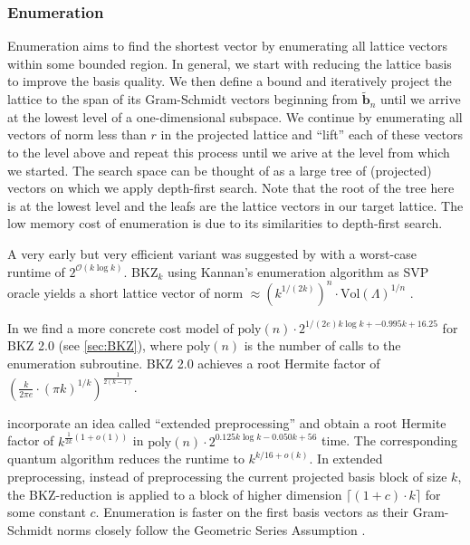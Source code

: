 \subsubsection{Enumeration} %
Enumeration aims to find the shortest vector by enumerating all lattice vectors within some bounded region. In general, we start with reducing the lattice basis to improve the basis quality. We then define a bound and iteratively project the lattice to the span of its Gram-Schmidt vectors beginning from $\tilde{\mathbf{b}}_n$ until we arrive at the lowest level of a one-dimensional subspace. We continue by enumerating all vectors of norm less than $r$ in the projected lattice and ``lift'' each of these vectors to the level above and repeat this process until we arive at the level from which we started. The search space can be thought of as a large tree of (projected) vectors on which we apply depth-first search. Note that the root of the tree here is at the lowest level and the leafs are the lattice vectors in our target lattice. %
The low memory cost of enumeration is due to its similarities to depth-first search. 

A very early but very efficient variant was suggested by \citet{Kan83} with a worst-case runtime of $2^{\mathcal{O}(k \log k)}$. BKZ$_k$ using Kannan's enumeration algorithm as SVP oracle yields a short lattice vector of norm $\approx (k^{1/(2k)})^n\cdot \text{Vol}(\Lambda)^{1/n}$ \cite{HS07, ABFKSW20}. %

In \cite{Chen13, ABFKSW20} we find a more concrete cost model of $\text{poly}(n) \cdot 2^{1/(2e) k \log k + - 0.995 k + 16.25}$ for BKZ 2.0 (see \cref{sec:BKZ}), where $\text{poly}(n)$ is the number of calls to the enumeration subroutine. BKZ 2.0 achieves a  root Hermite factor of $\left(\frac{k}{2\pi e} \cdot (\pi k)^{1/k}\right)^{\frac{1}{2(k-1)}}$. 

\citet{ABFKSW20} incorporate an idea called ``extended preprocessing'' and obtain a root Hermite factor of $k^{\frac{1}{2k}(1 + o(1))}$ in $\text{poly}(n) \cdot 2^{0.125k \log k - 0.050k + 56}$ time. The corresponding quantum algorithm reduces the runtime to $k^{k/16 + o(k)}$. In extended preprocessing, instead of preprocessing the current projected basis block of size $k$, the BKZ-reduction is applied to a block of higher dimension $\lceil (1+c)\cdot k\rceil$ for some constant $c$. Enumeration is faster on the first basis vectors as their Gram-Schmidt norms closely follow the Geometric Series Assumption \cite{MW16}. %


